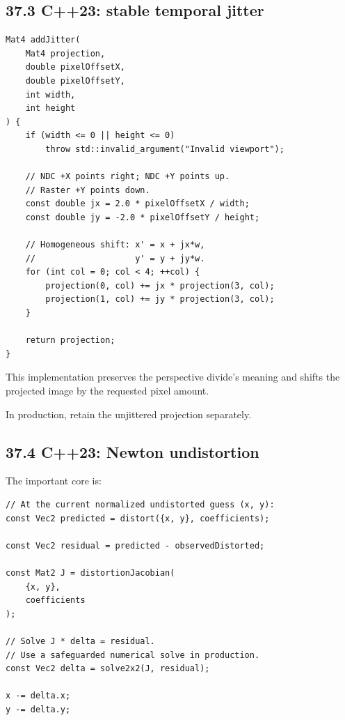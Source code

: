 \subsection{37.3 C++23: stable temporal jitter}\label{02-foundations-ii-ch037-c23-stable-temporal-jitter}

\hypertarget{02-foundations-ii-ch037-c23-stable-temporal-jitter}{}

\begin{verbatim}
Mat4 addJitter(
    Mat4 projection,
    double pixelOffsetX,
    double pixelOffsetY,
    int width,
    int height
) {
    if (width <= 0 || height <= 0)
        throw std::invalid_argument("Invalid viewport");

    // NDC +X points right; NDC +Y points up.
    // Raster +Y points down.
    const double jx = 2.0 * pixelOffsetX / width;
    const double jy = -2.0 * pixelOffsetY / height;

    // Homogeneous shift: x' = x + jx*w,
    //                    y' = y + jy*w.
    for (int col = 0; col < 4; ++col) {
        projection(0, col) += jx * projection(3, col);
        projection(1, col) += jy * projection(3, col);
    }

    return projection;
}
\end{verbatim}

This implementation preserves the perspective divide's meaning and shifts the projected image by the requested pixel amount.

In production, retain the unjittered projection separately.

\subsection{37.4 C++23: Newton undistortion}\label{02-foundations-ii-ch037-c23-newton-undistortion}

\hypertarget{02-foundations-ii-ch037-c23-newton-undistortion}{}

The important core is:

\begin{verbatim}
// At the current normalized undistorted guess (x, y):
const Vec2 predicted = distort({x, y}, coefficients);

const Vec2 residual = predicted - observedDistorted;

const Mat2 J = distortionJacobian(
    {x, y},
    coefficients
);

// Solve J * delta = residual.
// Use a safeguarded numerical solve in production.
const Vec2 delta = solve2x2(J, residual);

x -= delta.x;
y -= delta.y;
\end{verbatim}

